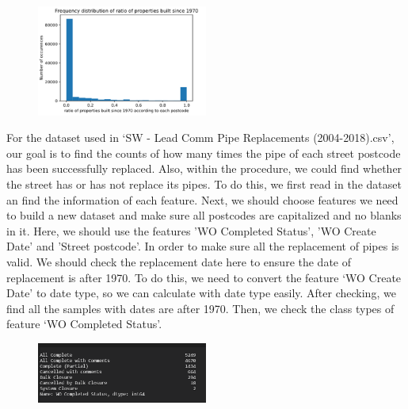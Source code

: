 \documentclass[11pt,twoside]{article}
\numberwithin{Theorem}{section}
\numberwithin{Definition}{section}
\numberwithin{Lemma}{section}
\numberwithin{Algorithm}{section}
\numberwithin{equation}{section}
\begin{document}
\begin{figure}[!ht]
    \centering
    \includegraphics[width=0.5\textwidth]{p9.png}
    \end{figure}

For the dataset used in ‘SW - Lead Comm Pipe Replacements (2004-2018).csv’, our goal is to find the counts of how many times the pipe of each street postcode has been successfully replaced. Also, within the procedure, we could find whether the street has or has not replace its pipes. To do this, we first read in the dataset an find the information of each feature. Next, we should choose features we need to build a new dataset and make sure all postcodes are capitalized and no blanks in it. Here, we should use the features 'WO Completed Status', 'WO Create Date' and 'Street postcode'. In order to make sure all the replacement of pipes is valid. We should check the replacement date here to ensure the date of replacement is after 1970. To do this, we need to convert the feature ‘WO Create Date’ to date type, so we can calculate with date type easily. After checking, we find all the samples with dates are after 1970. Then, we check the class types of feature ‘WO Completed Status’.

\begin{figure}[!ht]
    \centering
    \includegraphics[width=0.5\textwidth]{p10.png}
    \end{figure}
\end{document}
